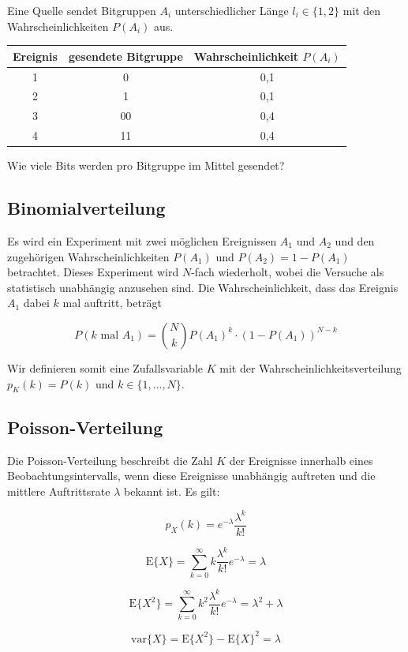 \begin{beispiel}
Eine Quelle sendet Bitgruppen $A_i$ unterschiedlicher Länge $l_i \in \{1,2\}$ mit den Wahrscheinlichkeiten $P(A_i)$ aus.

\begin{center}
\begin{tabular}{c|c|c}
  \hline
  Ereignis & gesendete Bitgruppe & Wahrscheinlichkeit $P(A_i)$ \\
  \hline
  1 & 0  & 0{,}1 \\
  2 & 1  & 0{,}1 \\
  3 & 00 & 0{,}4 \\
  4 & 11 & 0{,}4 \\
  \hline
\end{tabular}
\end{center}

Wie viele Bits werden pro Bitgruppe im Mittel gesendet?
\end{beispiel}

\subsection{Binomialverteilung}
\label{sec:binomialverteilung}

\begin{definition}[Binomialverteilung]
Es wird ein Experiment mit zwei möglichen Ereignissen $A_1$ und $A_2$ und den zugehörigen Wahrscheinlichkeiten $P(A_1)$ und $P(A_2) = 1 - P(A_1)$ betrachtet. Dieses Experiment wird $N$-fach wiederholt, wobei die Versuche als statistisch unabhängig anzusehen sind. Die Wahrscheinlichkeit, dass das Ereignis $A_1$ dabei $k$ mal auftritt, beträgt

$$
P(k \text{ mal } A_1) = \binom{N}{k} P(A_1)^k \cdot (1 - P(A_1))^{N-k}
$$

Wir definieren somit eine Zufallsvariable $K$ mit der Wahrscheinlichkeitsverteilung $p_K(k) = P(k)$ und $k \in \{1, \ldots, N\}$.
\end{definition}


\subsection{Poisson-Verteilung}
\label{sec:poisson-verteilung}

\begin{definition}
Die Poisson-Verteilung beschreibt die Zahl $K$ der Ereignisse innerhalb eines Beobachtungsintervalls, wenn diese Ereignisse unabhängig auftreten und die mittlere Auftrittsrate $\lambda$ bekannt ist. Es gilt:

$$
p_X(k) = e^{-\lambda} \frac{\lambda^k}{k!}
$$

$$
\mathrm{E}\{X\} = \sum_{k=0}^{\infty} k \frac{\lambda^k}{k!} e^{-\lambda} = \lambda
$$

$$
\mathrm{E}\{X^2\} = \sum_{k=0}^{\infty} k^2 \frac{\lambda^k}{k!} e^{-\lambda} = \lambda^2 + \lambda
$$

$$
\mathrm{var}\{X\} = \mathrm{E}\{X^2\} - \mathrm{E}\{X\}^2 = \lambda
$$
\end{definition}

